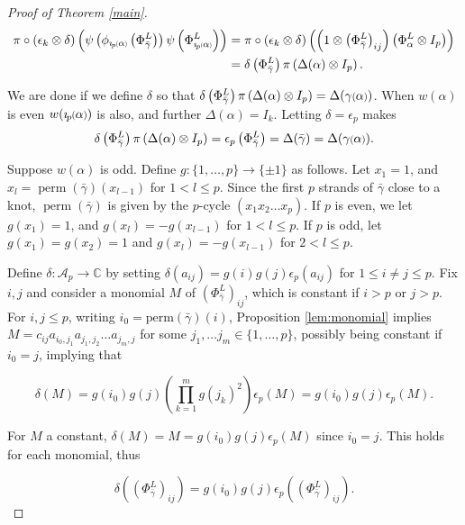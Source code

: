 \documentclass[11pt]{amsart}
\def\C{{\mathbb C}}
\def\A{{\mathcal A}}
\newcommand*{\smallp}[1]{\scalebox{.75}{\ensuremath#1}}
\newcommand*{\subsmallp}[1]{\scalebox{.5}{\ensuremath#1}}
\newcommand{\pp}[2][p]{\imath_{\hspace*{-1pt}#1}\hspace*{-.5pt}\smallp(#2\smallp)}
\newcommand{\subpp}[2][p]{\imath_{\hspace*{-1pt}#1}\hspace*{-.5pt}\subsmallp(#2\subsmallp)}
\newcommand\perm{\operatorname{perm}}
\theoremstyle{definition}
\begin{document}
\begin{proof}[Proof of Theorem \ref{main}]
\begin{align*}
\pi\circ(\epsilon_k\otimes\delta)\left(\psi\left(\phi_{\subpp\alpha}\left(\Phi_{\bar\gamma}^L\right)\right)\psi\left(\Phi_{\subpp\alpha}^L\right)\right)
    & = \pi\circ(\epsilon_k\otimes\delta)\left(\left(1\otimes \left(\Phi_{\bar\gamma}^L\right)_{ij}\right)\left(\Phi_\alpha^L\otimes I_p\right)\right)\\
    & = \delta\left(\Phi_{\bar\gamma}^L\right)\pi\left(\Delta(\alpha)\otimes I_p\right).
\end{align*}

We are done if we define $\delta$ so that $\delta\left(\Phi_{\bar\gamma}^L\right)\pi\left(\Delta(\alpha)\otimes I_p\right) = \Delta(\gamma\smallp(\alpha\smallp))$.  When $w(\alpha)$ is even $w(\pp\alpha)$ is also, and further $\Delta(\alpha)=I_k$. Letting $\delta = \epsilon_p$ makes 
\begin{equation*}
\delta\left(\Phi_{\bar\gamma}^L\right)\pi\left(\Delta(\alpha)\otimes I_p\right) = \epsilon_p\left(\Phi_{\bar\gamma}^L\right) = \Delta(\bar\gamma) = \Delta(\gamma\smallp(\alpha\smallp)).
\end{equation*}

Suppose $w(\alpha)$ is odd. Define $g\colon \{1,\ldots,p\}\rightarrow \{\pm 1\}$ as follows. Let $x_1 = 1$, and $x_l = \perm(\bar\gamma)(x_{l-1})$ for $1<l\le p$. Since the first $p$ strands of $\bar\gamma$ close to a knot, $\perm(\bar\gamma)$ is given by the $p$-cycle $(x_1x_2\ldots x_p)$. If $p$ is even, we let $g(x_1) = 1$, and $g(x_l) = -g(x_{l-1})$ for $1<l\le p$. If $p$ is odd, let $g(x_1) = g(x_2) = 1$ and $g(x_l) = -g(x_{l-1})$ for $2<l\le p$.

 Define $\delta: \A_p\to \C$ by setting $\delta(a_{ij}) = g(i)g(j)\epsilon_p(a_{ij})$ for $1\le i\ne j\le p$. Fix $i,j$ and consider a monomial $M$ of $\left(\Phi_{\bar\gamma}^L\right)_{ij}$, which is constant if $i>p$ or $j>p$. For $i,j\le p$, writing $i_0=\text{perm}(\bar\gamma)(i)$, Proposition \ref{lem:monomial} implies $M=c_{ij}a_{i_0,j_1}a_{j_1,j_2}\ldots a_{j_m,j}$ for some $j_1,\ldots j_m\in \{1,\ldots,p\}$, possibly being constant if $i_0=j$, implying that 

$$\delta(M) = g(i_0)g(j)\left(\prod_{k=1}^m g(j_k)^2\right)\epsilon_p(M) = g(i_0)g(j)\epsilon_p(M).$$

\noindent For $M$ a constant, $\delta(M) = M = g(i_0)g(j)\epsilon_p(M)$ since $i_0=j$. This holds for each monomial, thus

$$\delta\left(\left(\Phi_{\bar\gamma}^L\right)_{ij}\right) = g(i_0)g(j)\epsilon_p\left(\left(\Phi_{\bar\gamma}^L\right)_{ij}\right).$$


\end{proof}
\end{document}
